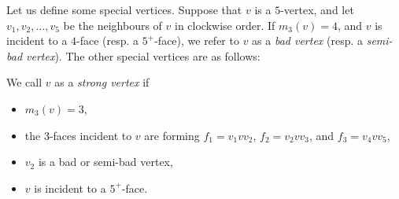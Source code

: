 \documentclass[12pt, reqno]{amsart}
\theoremstyle{plain}
\newtheorem{corollary}[equation]{Corollary}
\newtheorem{lemma}[equation]{Lemma}
\theoremstyle{definition}
\numberwithin{equation}{section}
\begin{document}




Let us define some special vertices. Suppose that $v$ is a $5$-vertex, and let $v_1, v_2, \ldots, v_5$ be the neighbours of $v$ in clockwise order. If $m_3(v) = 4$, and $v$ is incident to a $4$-face (resp. a $5^+$-face), we refer to $v$ as a \emph{bad vertex} (resp. a \emph{semi-bad vertex}). The other special vertices are as follows: \medskip


We call $v$ as a \emph{strong vertex}  if 
\begin{itemize}
\item $m_3(v)=3$,
\item the $3$-faces incident to $v$ are forming $f_1=v_1vv_2$, $f_2=v_2vv_3$, and $f_3=v_4vv_5$,
\item $v_2$ is a bad or semi-bad vertex,
\item $v$ is incident to a $5^+$-face.
\end{itemize}
\end{document}
